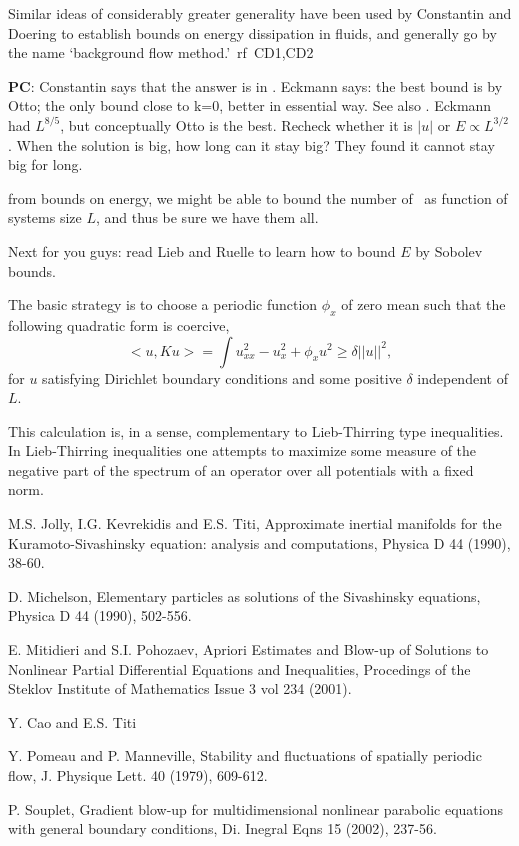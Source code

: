 Similar ideas of considerably greater generality have been used by
Constantin and Doering to establish bounds on energy dissipation in
fluids, and generally go by the name `background flow
method.'~rf~{CD1,CD2}

%
{\bf PC}:
Constantin says that the answer is in . Eckmann says:
the  best bound is by Otto; the only bound close to k=0,
better in essential way. See also . Eckmann had
$L^{8/5}$, but conceptually Otto is the best. Recheck whether it is $|u|$
or $E \propto L^{3/2}$. When the solution is big, how long can it stay
big? They found it cannot stay big for long.

from bounds on energy, we might be able to bound the number of \eqva\ as
function of systems size $L$, and thus be sure we have them all.

Next for you guys: read Lieb and Ruelle to learn how to bound $E$  by
Sobolev bounds.

The basic strategy is to choose a periodic function $\phi_x$ of zero mean
such that the following quadratic form is coercive,
\[
<\!\!u, K u\!\!>= \int u_{xx}^2 - u_x^2 + \phi_x u^2 \ge \delta |\!|u|\!|^2,
\]
for $u$ satisfying Dirichlet boundary conditions and some positive
$\delta$ independent of $L$.

This calculation is, in a sense, complementary to Lieb-Thirring type
inequalities. In Lieb-Thirring inequalities one attempts to maximize some
measure of the negative part of the spectrum of an operator over all
potentials with a fixed norm.

M.S. Jolly, I.G. Kevrekidis and E.S. Titi,
Approximate inertial manifolds for the {Kuramoto-Sivashinsky} equation:
analysis and computations,
Physica D 44 (1990), 38-60.

D. Michelson, Elementary particles as solutions of the Sivashinsky
equations, Physica D 44 (1990), 502-556.

E. Mitidieri and S.I. Pohozaev,
Apriori Estimates and Blow-up of Solutions to Nonlinear Partial
Differential Equations and Inequalities,
Procedings of the Steklov Institute of Mathematics Issue 3 vol 234
(2001).

Y. Cao and E.S. Titi

Y. Pomeau and P. Manneville,
Stability and fluctuations of spatially periodic flow,
J. Physique Lett. 40 (1979), 609-612.

P. Souplet,
Gradient blow-up for multidimensional nonlinear parabolic equations with
general boundary conditions,
Di. Inegral Eqns 15 (2002), 237-56.

